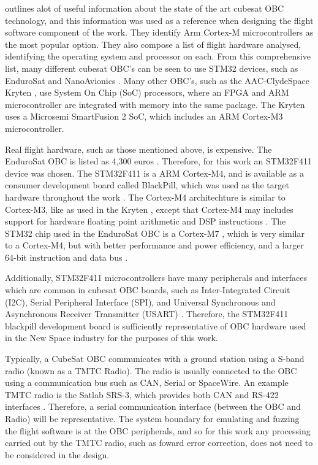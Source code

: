 \documentclass[../report.tex]{subfiles}
\begin{document}
\citet{Cratere_2024} outlines alot of useful information about the state of the
art cubesat OBC technology, and this information was used as a reference when
designing the flight software component of the work. They identify Arm Cortex-M
microcontrollers as the most popular option. They also compose a list of flight
hardware analysed, identifying the operating system and processor on each.
From this comprehensive list, many different cubesat OBC's can be seen to use
STM32 devices, such as EnduroSat \citep{EnduroSat_OBC} and NanoAvionics
\citep{Nano_OBC}. Many other OBC's, such as the AAC-ClydeSpace Kryten
\citep{Clydespace_Kryten}, use System On Chip (SoC) processors, where an FPGA
and ARM microcontroller are integrated with memory into the same package. The
Kryten uses a Microsemi SmartFusion 2 SoC, which includes an ARM Cortex-M3
microcontroller.

Real flight hardware, such as those mentioned above, is expensive. The
EnduroSat OBC is listed as 4,300 euros \citep{EnduroSat_OBC}. Therefore, for
this work an STM32F411 device was chosen. The STM32F411 is a ARM Cortex-M4, and
is available as a consumer development board called BlackPill, which was used
as the target hardware throughout the work \citep{blackpill_info}. The
Cortex-M4 architechture is similar to Cortex-M3, like as used in the Kryten
\citep{Clydespace_Kryten}, except that Cortex-M4 may includes support for
hardware floating point arithmetic and DSP instructions \citep{Cortex_M3}
\citep{Cortex_M4}. The STM32 chip used in the EnduroSat OBC is a Cortex-M7
\citep{EnduroSat_OBC}, which is very similar to a Cortex-M4, but with better
performance and power efficiency, and a larger 64-bit instruction and data bus
\citep{Cortex_M7}.

Additionally, STM32F411 microcontrollers have many peripherals and interfaces
which are common in cubesat OBC boards, such as Inter-Integrated Circuit (I2C),
Serial Peripheral Interface (SPI), and Universal Synchronous and Asynchronous
Receiver Transmitter (USART) \citep{Cratere_2024}. Therefore, the STM32F411
blackpill development board is sufficiently representative of OBC hardware used
in the New Space industry for the purposes of this work.

Typically, a CubeSat OBC communicates with a ground station using a S-band
radio (known as a TMTC Radio). The radio is usually connected to the OBC using
a communication bus such as CAN, Serial or SpaceWire. An example TMTC radio is
the Satlab SRS-3, which provides both CAN and RS-422 interfaces
\citep{Satlab_SRS3}. Therefore, a serial communication interface (between the
OBC and Radio) will be representative. The system boundary for emulating and
fuzzing the flight software is at the OBC peripherals, and so for this work any
processing carried out by the TMTC radio, such as foward error correction, does
not need to be considered in the design.
\end{document}
